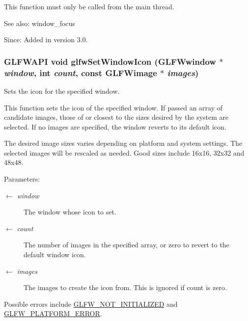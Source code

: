 This function must only be called from the main thread.

\begin{Desc}
\item[See also:]window\_\-focus\end{Desc}
\begin{Desc}
\item[Since:]Added in version 3.0. \end{Desc}
\hypertarget{group__window_g182987a1a62a41a924842b9473d560df}{
\subsubsection[glfwSetWindowIcon]{\setlength{\rightskip}{0pt plus 5cm}GLFWAPI void glfwSetWindowIcon ({\bf GLFWwindow} $\ast$ {\em window}, \/  int {\em count}, \/  const {\bf GLFWimage} $\ast$ {\em images})}}
\label{group__window_g182987a1a62a41a924842b9473d560df}


Sets the icon for the specified window. 

This function sets the icon of the specified window. If passed an array of candidate images, those of or closest to the sizes desired by the system are selected. If no images are specified, the window reverts to its default icon.

The desired image sizes varies depending on platform and system settings. The selected images will be rescaled as needed. Good sizes include 16x16, 32x32 and 48x48.

\begin{Desc}
\item[Parameters:]
\begin{description}
\item[\mbox{$\leftarrow$} {\em window}]The window whose icon to set. \item[\mbox{$\leftarrow$} {\em count}]The number of images in the specified array, or zero to revert to the default window icon. \item[\mbox{$\leftarrow$} {\em images}]The images to create the icon from. This is ignored if count is zero.\end{description}
\end{Desc}
Possible errors include \hyperlink{group__errors_g2374ee02c177f12e1fa76ff3ed15e14a}{GLFW\_\-NOT\_\-INITIALIZED} and \hyperlink{group__errors_gd44162d78100ea5e87cdd38426b8c7a1}{GLFW\_\-PLATFORM\_\-ERROR}.

